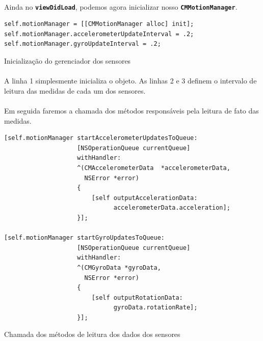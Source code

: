\documentclass[a4paper,12pt,brazil,doubleside]{book}
\begin{document}
\begin{singlespace}
\paragraph{}Ainda no \texttt{\textbf{viewDidLoad}}, podemos agora inicializar nosso \texttt{\textbf{CMMotionManager}}.

\begin{listing}[H]
\begin{verbatim}
self.motionManager = [[CMMotionManager alloc] init];
self.motionManager.accelerometerUpdateInterval = .2;
self.motionManager.gyroUpdateInterval = .2;
\end{verbatim}
\caption{Inicialização do gerenciador dos sensores}
\end{listing}

\paragraph{}A linha 1 simplesmente inicializa o objeto. As linhas 2 e 3 definem o intervalo de leitura das medidas de cada um dos sensores.
\paragraph{}Em seguida faremos a chamada dos métodos responsáveis pela leitura de fato das medidas.

\begin{listing}[H]
\begin{verbatim}
[self.motionManager startAccelerometerUpdatesToQueue:
                    [NSOperationQueue currentQueue]
                    withHandler:
                    ^(CMAccelerometerData  *accelerometerData,
                      NSError *error)
                    {
                    	[self outputAccelerationData:
                    	      accelerometerData.acceleration];
                    }];
    
[self.motionManager startGyroUpdatesToQueue:
                    [NSOperationQueue currentQueue]
                    withHandler:
                    ^(CMGyroData *gyroData,
                      NSError *error)
                    {
                    	[self outputRotationData:
                    	      gyroData.rotationRate];
                    }];
\end{verbatim}
\caption{Chamada dos métodos de leitura dos dados dos sensores}
\end{listing}


\end{singlespace}
\end{document}
